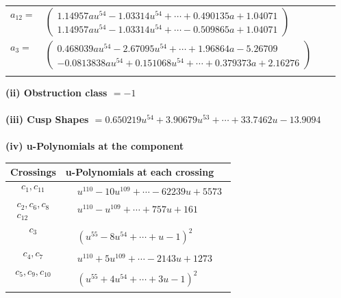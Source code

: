 \documentclass[1p]{elsarticle_modified}
\theoremstyle{definition}
\begin{document}
\begin{tabular}{m{7pt} m{180pt} m{7pt} m{180pt} }
\flushright $a_{12}=$&$\begin{pmatrix}1.14957 a u^{54}-1.03314 u^{54}+\cdots+0.490135 a+1.04071\\1.14957 a u^{54}-1.03314 u^{54}+\cdots-0.509865 a+1.04071\end{pmatrix}$ \\
\flushright $a_{3}=$&$\begin{pmatrix}0.468039 a u^{54}-2.67095 u^{54}+\cdots+1.96864 a-5.26709\\-0.0813838 a u^{54}+0.151068 u^{54}+\cdots+0.379373 a+2.16276\end{pmatrix}$\\&\end{tabular}
\flushleft \textbf{(ii) Obstruction class $= -1$}\\~\\
\flushleft \textbf{(iii) Cusp Shapes $= 0.650219 u^{54}+3.90679 u^{53}+\cdots+33.7462 u-13.9094$}\\~\\
\newpage\renewcommand{\arraystretch}{1}
\flushleft \textbf{(iv) u-Polynomials at the component}\newline \\
\begin{tabular}{m{50pt}|m{274pt}}
Crossings & \hspace{64pt}u-Polynomials at each crossing \\
\hline $$\begin{aligned}c_{1},c_{11}\end{aligned}$$&$\begin{aligned}
&u^{110}-10 u^{109}+\cdots-62239 u+5573
\end{aligned}$\\
\hline $$\begin{aligned}c_{2},c_{6},c_{8}\\c_{12}\end{aligned}$$&$\begin{aligned}
&u^{110}- u^{109}+\cdots+757 u+161
\end{aligned}$\\
\hline $$\begin{aligned}c_{3}\end{aligned}$$&$\begin{aligned}
&(u^{55}-8 u^{54}+\cdots+u-1)^{2}
\end{aligned}$\\
\hline $$\begin{aligned}c_{4},c_{7}\end{aligned}$$&$\begin{aligned}
&u^{110}+5 u^{109}+\cdots-2143 u+1273
\end{aligned}$\\
\hline $$\begin{aligned}c_{5},c_{9},c_{10}\end{aligned}$$&$\begin{aligned}
&(u^{55}+4 u^{54}+\cdots+3 u-1)^{2}
\end{aligned}$\\
\hline
\end{tabular}\\~\\
\end{document}
